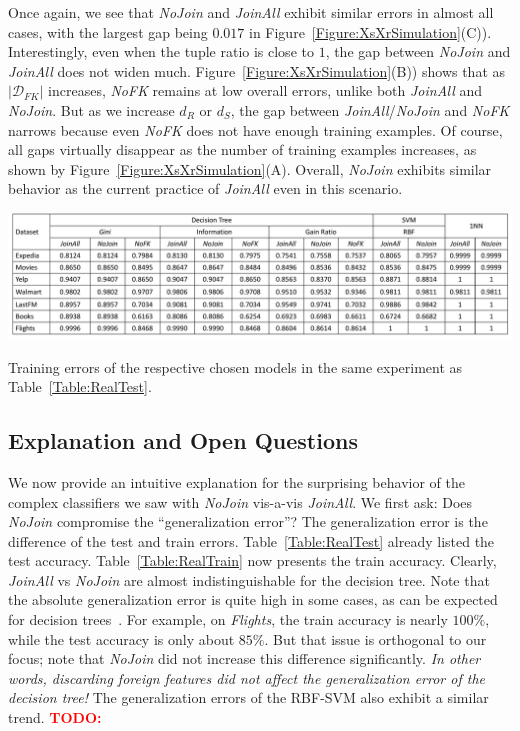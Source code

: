 \documentclass[sigconf]{acmart}
\newcommand{\red}{\textcolor{red}}
\begin{document}
Once again, we see that \textit{NoJoin} and \textit{JoinAll} exhibit similar errors in almost all cases, with the largest gap being $0.017$ in Figure~\ref{Figure:XsXrSimulation}(C)).
Interestingly, even when the tuple ratio is close to $1$, the gap between \textit{NoJoin} and \textit{JoinAll} does not widen much. 
Figure~\ref{Figure:XsXrSimulation}(B)) shows that as $|\mathcal{D}_{FK}|$ increases, \textit{NoFK} remains at low overall errors, unlike both \textit{JoinAll} and \textit{NoJoin}.
But as we increase $d_R$ or $d_S$, the gap between \textit{JoinAll}/\textit{NoJoin} and \textit{NoFK} narrows because even \textit{NoFK} does not have enough training examples.
Of course, all gaps virtually disappear as the number of training examples increases, as shown by Figure~\ref{Figure:XsXrSimulation}(A).
Overall, \textit{NoJoin} exhibits similar behavior as the current practice of \textit{JoinAll} even in this scenario.

\begin{table}
\centering
\includegraphics[width=2\columnwidth]{table3.pdf}
\caption{Training errors of the respective chosen models in the same experiment as Table~\ref{Table:RealTest}.}
\label{Table:RealTrain}
\vspace{-2mm}
\end{table}

\subsection{Explanation and Open Questions}

We now provide an intuitive explanation for the surprising behavior of the complex classifiers we saw with \textit{NoJoin} vis-a-vis \textit{JoinAll}.
We first ask: {Does \textit{NoJoin} compromise the ``generalization error''?} The generalization error is the difference of the test and train errors.
Table~\ref{Table:RealTest} already listed the test accuracy. Table~\ref{Table:RealTrain} now presents the train accuracy. Clearly, \textit{JoinAll} vs 
\textit{NoJoin} are almost indistinguishable for the decision tree. Note that the absolute generalization error is quite high in some cases, 
as can be expected for decision trees~\cite{dtreebias2}. For example, on \textit{Flights}, the train accuracy is nearly $100\%$, while the test accuracy is only about $85\%$.
But that issue is orthogonal to our focus; note that \textit{NoJoin} did not increase this difference significantly. \textit{In other words, discarding foreign 
features did not affect the generalization error of the decision tree!} The generalization errors of the RBF-SVM also exhibit a similar trend. \red{\textbf{TODO:}}
\end{document}
